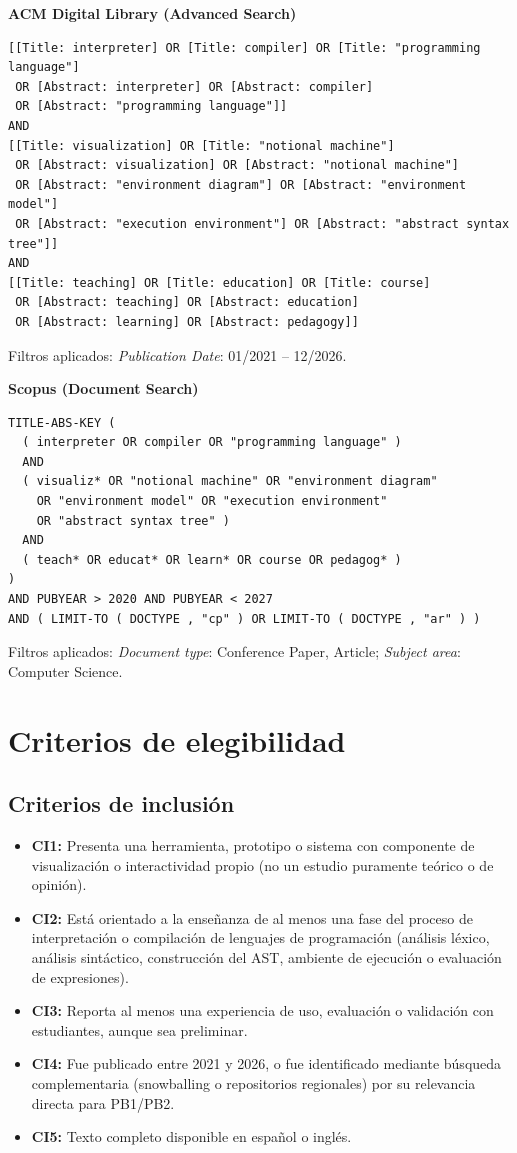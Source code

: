 \noindent\textbf{ACM Digital Library (Advanced Search)}

\begin{lstlisting}
[[Title: interpreter] OR [Title: compiler] OR [Title: "programming language"]
 OR [Abstract: interpreter] OR [Abstract: compiler]
 OR [Abstract: "programming language"]]
AND
[[Title: visualization] OR [Title: "notional machine"]
 OR [Abstract: visualization] OR [Abstract: "notional machine"]
 OR [Abstract: "environment diagram"] OR [Abstract: "environment model"]
 OR [Abstract: "execution environment"] OR [Abstract: "abstract syntax tree"]]
AND
[[Title: teaching] OR [Title: education] OR [Title: course]
 OR [Abstract: teaching] OR [Abstract: education]
 OR [Abstract: learning] OR [Abstract: pedagogy]]
\end{lstlisting}
Filtros aplicados: \emph{Publication Date}: 01/2021 -- 12/2026.

\noindent\textbf{Scopus (Document Search)}

\begin{lstlisting}
TITLE-ABS-KEY (
  ( interpreter OR compiler OR "programming language" )
  AND
  ( visualiz* OR "notional machine" OR "environment diagram"
    OR "environment model" OR "execution environment"
    OR "abstract syntax tree" )
  AND
  ( teach* OR educat* OR learn* OR course OR pedagog* )
)
AND PUBYEAR > 2020 AND PUBYEAR < 2027
AND ( LIMIT-TO ( DOCTYPE , "cp" ) OR LIMIT-TO ( DOCTYPE , "ar" ) )
\end{lstlisting}
Filtros aplicados: \emph{Document type}: Conference Paper, Article; \emph{Subject area}: Computer Science.

\section{Criterios de elegibilidad}

\subsection{Criterios de inclusión}

\begin{itemize}
    \item \textbf{CI1:} Presenta una herramienta, prototipo o sistema con componente de visualización o interactividad propio (no un estudio puramente teórico o de opinión).
    \item \textbf{CI2:} Está orientado a la enseñanza de al menos una fase del proceso de interpretación o compilación de lenguajes de programación (análisis léxico, análisis sintáctico, construcción del AST, ambiente de ejecución o evaluación de expresiones).
    \item \textbf{CI3:} Reporta al menos una experiencia de uso, evaluación o validación con estudiantes, aunque sea preliminar.
    \item \textbf{CI4:} Fue publicado entre 2021 y 2026, o fue identificado mediante búsqueda complementaria (snowballing o repositorios regionales) por su relevancia directa para PB1/PB2.
    \item \textbf{CI5:} Texto completo disponible en español o inglés.
\end{itemize}

